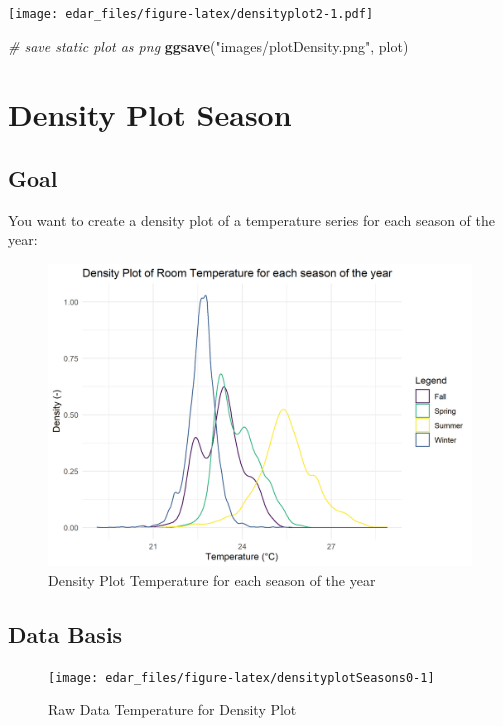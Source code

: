 \documentclass[
  a4paperpaper,
]{book}
\newenvironment{Shaded}{\begin{snugshade}}{\end{snugshade}}
\newcommand{\CommentTok}[1]{\textcolor[rgb]{0.56,0.35,0.01}{\textit{#1}}}
\newcommand{\KeywordTok}[1]{\textcolor[rgb]{0.13,0.29,0.53}{\textbf{#1}}}
\newcommand{\NormalTok}[1]{#1}
\newcommand{\StringTok}[1]{\textcolor[rgb]{0.31,0.60,0.02}{#1}}
\let\oldShaded\Shaded
\let\endoldShaded\endShaded
\renewenvironment{Shaded}{\footnotesize\oldShaded}{\endoldShaded}
\begin{document}
\texttt{[image: edar\_files/figure-latex/densityplot2-1.pdf]}

\begin{Shaded}
\begin{Highlighting}[]
\CommentTok{# save static plot as png}
\KeywordTok{ggsave}\NormalTok{(}\StringTok{"images/plotDensity.png"}\NormalTok{, plot)}
\end{Highlighting}
\end{Shaded}

\newpage

\hypertarget{density-plot-season}{%
\section{Density Plot Season}\label{density-plot-season}}

\hypertarget{goal-3}{%
\subsection{Goal}\label{goal-3}}

You want to create a density plot of a temperature series for each season of the year:

\begin{figure}
\includegraphics[width=0.7\linewidth]{images/plotDensitySeasons} \caption{Density Plot Temperature for each season of the year}\label{fig:unnamed-chunk-13}
\end{figure}

\hypertarget{data-basis-3}{%
\subsection{Data Basis}\label{data-basis-3}}

\begin{figure}
\texttt{[image: edar\_files/figure-latex/densityplotSeasons0-1]} \caption{Raw Data Temperature for Density Plot}\label{fig:densityplotSeasons0}
\end{figure}
\newpage
\end{document}
